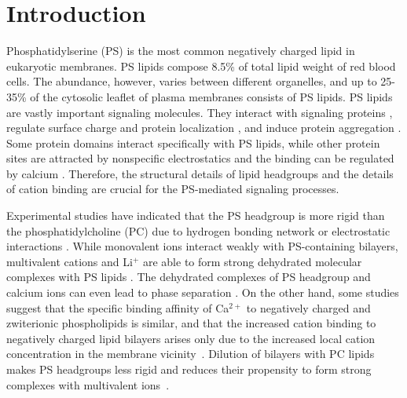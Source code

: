 \documentclass[aps,prl,superscriptaddress,twocolumn]{revtex4}
\begin{document}


\section{Introduction}
Phosphatidylserine (PS) is the most common negatively
charged lipid in eukaryotic membranes.
PS lipids compose 8.5\% of total lipid weight of red blood cells. 
The abundance, however, varies between different organelles, and up to
25-35\% of the cytosolic leaflet of plasma membranes \cite{lemmon08,leventis10,li14} consists of PS lipids.
PS lipids are vastly important signaling molecules. They interact with
signaling proteins \cite{leventis10}, regulate
surface charge and protein localization \cite{yeung08}, and
induce protein aggregation \cite{zhao04,gorbenko06}.
Some protein domains interact specifically with PS lipids,
while other protein sites are attracted by nonspecific electrostatics and the
binding can be regulated by calcium \cite{leventis10}.
Therefore, the structural details
of lipid headgroups and the details of cation binding
are crucial for the PS-mediated signaling processes.

Experimental studies have indicated that the
PS headgroup is more rigid than the phosphatidylcholine (PC)
due to hydrogen bonding network or
electrostatic interactions \cite{browning80,buldt81}.
While monovalent ions interact weakly with
PS-containing bilayers, multivalent cations and Li$^+$ are able to form strong
dehydrated molecular complexes with PS lipids \cite{hauser77,kurland79,eisenberg79,hauser83,dluhy83,hauser85,feigenson86,mattai89,roux90,roux91,boettcher11}.
The dehydrated complexes of PS headgroup and calcium ions can even lead to
phase separation \cite{hauser77,kurland79,hauser85,feigenson86,mattai89,roux90,roux91}.
On the other hand, some studies suggest that the specific binding affinity of Ca$^{2+}$
to negatively charged and zwiterionic phospholipids is similar, and that
the increased cation binding to negatively charged lipid bilayers arises only due
to the increased local cation concentration in the membrane vicinity~\cite{seelig90,sinn06}.
Dilution of bilayers with PC lipids makes PS headgroups
less rigid and reduces their propensity to form
strong complexes with multivalent ions~\cite{browning80,buldt81,roux90,roux91}.
\end{document}
